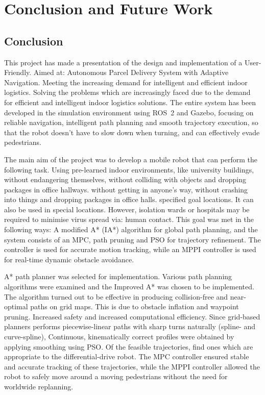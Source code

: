 \chapter{Conclusion and Future Work}
\section{Conclusion}

This project has made a presentation of the design and implementation of a User-Friendly. Aimed at: Autonomous Parcel Delivery System with Adaptive Navigation. Meeting the increasing demand for intelligent and efficient indoor logistics. Solving the problems which are increasingly faced due to the demand for efficient and intelligent indoor logistics solutions. The entire system has been developed in the simulation environment using ROS~2 and Gazebo, focusing on reliable navigation, intelligent path planning and smooth trajectory execution, so that the robot doesn't have to slow down when turning, and can effectively evade pedestrians.

The main aim of the project was to develop a mobile robot that can perform the following task. Using pre-learned indoor environments, like university buildings, without endangering themselves, without colliding with objects and dropping packages in office hallways. without getting in anyone's way, without crashing into things and dropping packages in office halls. specified goal locations. It can also be used in special locations. However, isolation wards or hospitals may be required to minimise virus spread via: human contact. This goal was met in the following ways: A modified A* (IA*) algorithm for global path planning, and the system consists of an MPC, path pruning and PSO for trajectory refinement. The controller is used for accurate motion tracking, while an MPPI controller is used for real-time dynamic obstacle avoidance.

A* path planner was selected for implementation. Various path planning algorithms were examined and the Improved A* was chosen to be implemented. The algorithm turned out to be effective in producing collision-free and near-optimal paths on grid maps. This is due to obstacle inflation and waypoint pruning. Increased safety and increased computational efficiency. Since grid-based planners performs piecewise-linear paths with sharp turns naturally (spline- and curve-spline), Continuous, kinematically correct profiles were obtained by applying smoothing using PSO. Of the feasible trajectories, find ones which are appropriate to the differential-drive robot. The MPC controller ensured stable and accurate tracking of these trajectories, while the MPPI controller allowed the robot to safely move around a moving pedestrians without the need for worldwide replanning.

